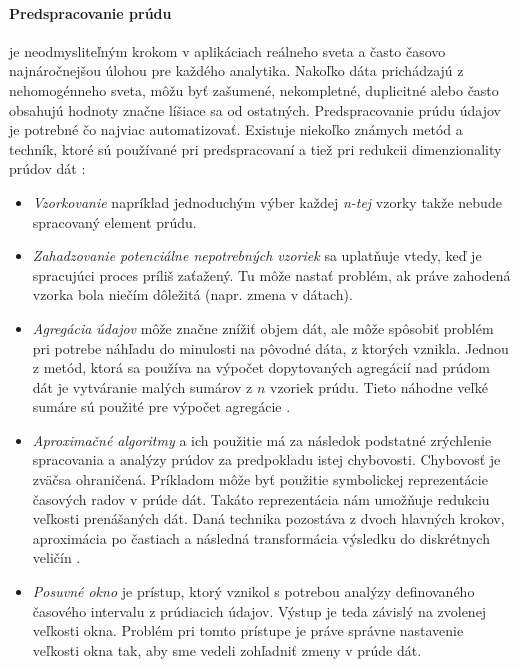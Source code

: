 \paragraph{Predspracovanie prúdu} je neodmysliteľným krokom v aplikáciach reálneho sveta a často časovo najnáročnejšou úlohou pre každého analytika. Nakoľko dáta prichádzajú z nehomogénneho sveta, môžu byť zašumené, nekompletné, duplicitné alebo často obsahujú hodnoty značne líšiace sa od ostatných. Predspracovanie prúdu údajov je potrebné čo najviac automatizovať. Existuje niekoľko známych metód a techník, ktoré sú používané pri predspracovaní a tiež pri redukcii dimenzionality prúdov dát \citep{krempl2014open, nguyen2015survey}:
\begin{itemize}
	\item \textit{Vzorkovanie} napríklad jednoduchým výber každej \textit{n-tej} vzorky takže nebude spracovaný element prúdu. 
	\item \textit{Zahadzovanie potenciálne nepotrebných vzoriek} sa uplatňuje vtedy, keď je spracujúci proces príliš zaťažený. Tu môže nastať problém, ak práve zahodená vzorka bola niečím dôležitá (napr. zmena v dátach).
	\item \textit{Agregácia údajov} môže značne znížiť objem dát, ale môže spôsobiť problém pri potrebe náhľadu do minulosti na pôvodné dáta, z ktorých vznikla. Jednou z metód, ktorá sa používa na výpočet dopytovaných agregácií nad prúdom dát je vytváranie malých sumárov z $n$ vzoriek prúdu. Tieto náhodne veľké sumáre sú použité pre výpočet agregácie \cite{dobra2002processing}.
	\item \textit{Aproximačné algoritmy} a ich použitie má za následok podstatné zrýchlenie spracovania a analýzy prúdov za predpokladu istej chybovosti. Chybovosť je zväčsa ohraničená. Príkladom môže byť použitie symbolickej reprezentácie časových radov v prúde dát. Takáto reprezentácia nám umožňuje redukciu veľkosti prenášaných dát. Daná technika pozostáva z dvoch hlavných krokov, aproximácia po častiach a následná transformácia výsledku do diskrétnych veličín \citep{sevcech2015symbolic}.
	\item \textit{Posuvné okno} je prístup, ktorý vznikol s potrebou analýzy definovaného časového intervalu z prúdiacich údajov. Výstup je teda závislý na zvolenej veľkosti okna. Problém pri tomto prístupe je práve správne nastavenie veľkosti okna tak, aby sme vedeli zohľadniť zmeny v prúde dát.
\end{itemize}

